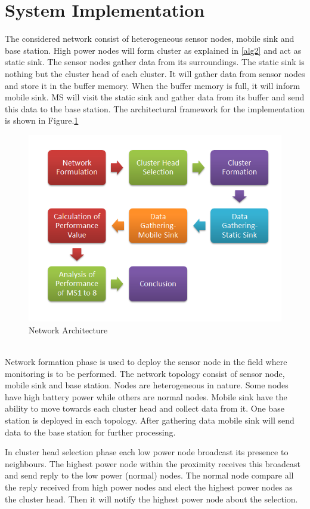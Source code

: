 \documentclass[MTech]{iitmdiss}
\begin{document}
\section{System Implementation}
The considered network consist of heterogeneous sensor nodes, mobile sink and base station. High power nodes will form cluster as explained in  \ref{alg2} and act as static sink. The sensor nodes gather data from its surroundings. The static sink is nothing but the cluster head of each cluster. It will gather data from sensor nodes and store it in the buffer memory. When the buffer memory is full, it will inform mobile sink. MS will visit the  static sink and gather data from its buffer  and send this data to the base station. The architectural framework for the implementation is shown in  Figure.\ref{f4}\\
\begin{figure}[ht!]
\centering
\includegraphics[scale=.8]{architecure.PNG}
\caption{Network Architecture\label{overflow}}
\label{f4}
\end{figure}\\
Network formation phase is used to deploy the sensor node in the field where monitoring is to be performed. The network topology consist of sensor node, mobile sink and base station. Nodes are heterogeneous in nature. Some nodes have high battery power while others are normal nodes. Mobile sink  have the ability to move towards each cluster head and collect data from it. One base station is deployed in each topology. After gathering data mobile sink will send data to the base station for further processing.


 In cluster head selection phase each low power node broadcast its presence to neighbours. The highest power node within the proximity receives this broadcast and send reply to the low power (normal) nodes. The normal node compare all the reply received from high power nodes and elect the highest power nodes as the cluster head. Then it will notify the highest power node about the selection.
 
\end{document}
